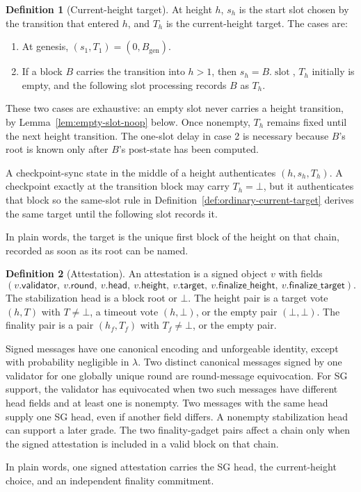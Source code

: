 \ifx\litemode\undefined\documentclass{article}\fi
\theoremstyle{plain}
\theoremstyle{definition}
\newtheorem{definition}{Definition}
\theoremstyle{remark}
\newcommand{\genesis}{B_{\mathrm{gen}}}
\newcommand{\validator}{\mathsf{validator}}
\newcommand{\height}{\mathsf{height}}
\newcommand{\target}{\mathsf{target}}
\newcommand{\finalizeHeight}{\mathsf{finalize\_height}}
\newcommand{\finalizeTarget}{\mathsf{finalize\_target}}
\newcommand{\headf}{\mathsf{head}}
\newcommand{\slot}{\operatorname{\mathrm{slot}}}
\begin{document}
\begin{definition}[Current-height target]\label{def:current-height-target}
At height \(h\), \(s_h\) is the start slot chosen by the transition that
entered \(h\), and \(T_h\) is the current-height target.  The cases are:
\begin{enumerate}
 \item At genesis, \((s_1,T_1)=(0,\genesis)\).
 \item If a block \(B\) carries the transition into \(h>1\), then
 \(s_h=B.\slot\), \(T_h\) initially is empty, and the following slot
 processing records \(B\) as \(T_h\).
\end{enumerate}
These two cases are exhaustive: an empty slot never carries a height
transition, by Lemma~\ref{lem:empty-slot-noop} below.
Once nonempty, \(T_h\) remains fixed until the next height transition.  The
one-slot delay in case 2 is necessary because \(B\)'s root is known only
after \(B\)'s post-state has been computed.

A checkpoint-sync state in the middle of a height authenticates
\((h,s_h,T_h)\).  A checkpoint exactly at the transition block may carry
\(T_h=\bot\), but it authenticates that block so the same-slot rule in
Definition~\ref{def:ordinary-current-target} derives the same target until
the following slot records it.

In plain words, the target is the unique first block of the height on that
chain, recorded as soon as its root can be named.
\end{definition}

\begin{definition}[Attestation]\label{def:fg-message}
An attestation is a signed object \(v\) with fields
\[
 (v.\validator,\ v.\mathsf{round},\ v.\headf,\ v.\height,\ v.\target,\
  v.\finalizeHeight,\ v.\finalizeTarget).
\]
The stabilization head is a block root or \(\bot\).
The height pair is a target vote
\((h,T)\) with \(T\neq\bot\), a timeout vote \((h,\bot)\), or the empty pair
\((\bot,\bot)\).  The finality pair is a pair \((h_f,T_f)\) with
\(T_f\neq\bot\), or the empty pair.

Signed messages have one canonical encoding and unforgeable identity,
except with probability negligible in \(\lambda\).
Two distinct canonical messages signed by one validator for one globally
unique round are round-message equivocation.  For SG support, the validator
has equivocated when two such messages have different head fields and at
least one is nonempty.  Two messages with the same head supply one SG head,
even if another field differs.  A nonempty stabilization head can support a
later grade.  The two finality-gadget pairs affect a chain only when the
signed attestation is included in a valid block on that chain.

In plain words, one signed attestation carries the SG head, the current-height
choice, and an independent finality commitment.
\end{definition}
\end{document}
